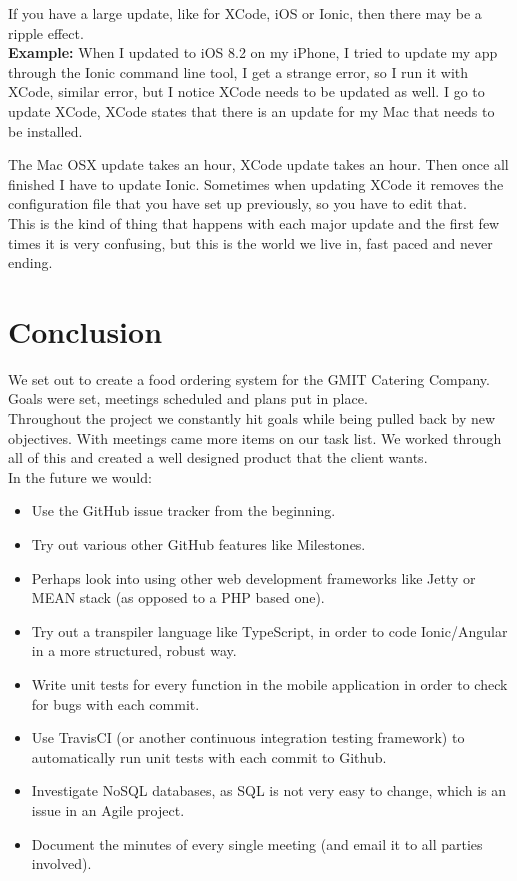 If you have a large update, like for XCode, iOS or Ionic, then there may be a ripple effect.
\\

\textbf{Example:}
When I updated to iOS 8.2 on my iPhone, I tried to update my app through the Ionic command line tool, I get a strange error, so I run it with XCode, similar error, but I notice XCode needs to be updated as well. I go to update XCode, XCode states that there is an update for my Mac that needs to be installed.

The Mac OSX update takes an hour, XCode update takes an hour. Then once all finished I have to update Ionic.
Sometimes when updating XCode it removes the configuration file that you have set up previously, so you have to edit that.
\\

This is the kind of thing that happens with each major update and the first few times it is very confusing, but this is the world we live in, fast paced and never ending.

\chapter{Conclusion}	%
We set out to create a food ordering system for the GMIT Catering Company.
Goals were set, meetings scheduled and plans put in place.
\\

Throughout the project we constantly hit goals while being pulled back by new objectives.
With meetings came more items on our task list.
We worked through all of this and created a well designed product that the client wants.
\\

\noindent In the future we would:
\begin{itemize}[noitemsep,nolistsep]
\item Use the GitHub issue tracker from the beginning.
\item Try out various other GitHub features like Milestones.
\item Perhaps look into using other web development frameworks like Jetty or MEAN stack (as opposed to a PHP based one).
\item Try out a transpiler language like TypeScript, in order to code Ionic/Angular in a more structured, robust way.
\item Write unit tests for every function in the mobile application in order to check for bugs with each commit.
\item Use TravisCI (or another continuous integration testing framework) to automatically run unit tests with each commit to Github.
\item Investigate NoSQL databases, as SQL is not very easy to change, which is an issue in an Agile project.
\item Document the minutes of every single meeting (and email it to all parties involved).
\end{itemize}
    \hfill 
    \\

